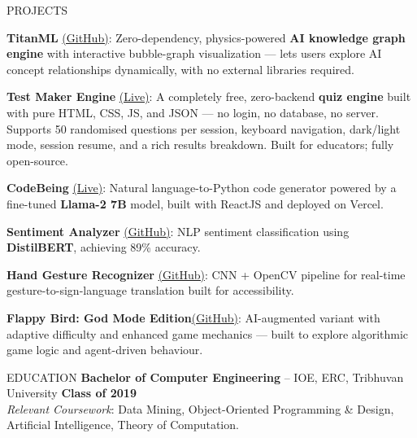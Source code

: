 \documentclass{resume}
\begin{document}
\begin{rSection}{PROJECTS}
\vspace{-1.25em}
\item \textbf{TitanML} \href{https://abhiverse01.github.io/titanML/}{(GitHub)}: Zero-dependency, physics-powered \textbf{AI knowledge graph engine} with interactive bubble-graph visualization — lets users explore AI concept relationships dynamically, with no external libraries required.

\item \textbf{Test Maker Engine} \href{https://abhiverse01.github.io/test-maker/}{(Live)}: A completely free, zero-backend \textbf{quiz engine} built with pure HTML, CSS, JS, and JSON — no login, no database, no server. Supports 50 randomised questions per session, keyboard navigation, dark/light mode, session resume, and a rich results breakdown. Built for educators; fully open-source.

\item \textbf{CodeBeing} \href{https://projectcodebeing.vercel.app/}{(Live)}: Natural language-to-Python code generator powered by a fine-tuned \textbf{Llama-2 7B} model, built with ReactJS and deployed on Vercel.

\item \textbf{Sentiment Analyzer} \href{https://github.com/abhiverse01/SentimentAnalysis-DistilBERT}{(GitHub)}: NLP sentiment classification using \textbf{DistilBERT}, achieving 89\% accuracy.

\item \textbf{Hand Gesture Recognizer} \href{https://github.com/abhiverse01/hand-gesture-recognizer}{(GitHub)}: CNN + OpenCV pipeline for real-time gesture-to-sign-language translation built for accessibility.

\item \textbf{Flappy Bird: God Mode Edition}\href{https://abhiverse01.github.io/Flappy-Bird/}{(GitHub)}: AI-augmented variant with adaptive difficulty and enhanced game mechanics — built to explore algorithmic game logic and agent-driven behaviour.

\end{rSection}

\begin{rSection}{EDUCATION}
{\bf Bachelor of Computer Engineering} – IOE, ERC, Tribhuvan University \hfill \textbf{Class of 2019} \\
\textit{Relevant Coursework}: Data Mining, Object-Oriented Programming \& Design, Artificial Intelligence, Theory of Computation.
\end{rSection}
\end{document}
